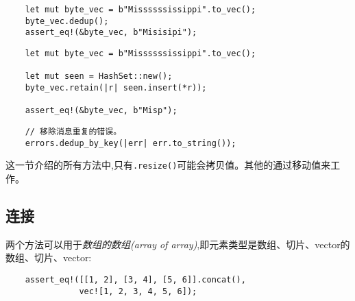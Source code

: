 \begin{verbatim}
    let mut byte_vec = b"Missssssissippi".to_vec();
    byte_vec.dedup();
    assert_eq!(&byte_vec, b"Misisipi");
\end{verbatim}
\begin{verbatim}
    let mut byte_vec = b"Missssssissippi".to_vec();

    let mut seen = HashSet::new();
    byte_vec.retain(|r| seen.insert(*r));

    assert_eq!(&byte_vec, b"Misp");
\end{verbatim}



\begin{verbatim}
    // 移除消息重复的错误。
    errors.dedup_by_key(|err| err.to_string());
\end{verbatim}

这一节介绍的所有方法中,只有\texttt{.resize()}可能会拷贝值。其他的通过移动值来工作。

\subsection{连接}
两个方法可以用于\emph{数组的数组(array of array)},即元素类型是数组、切片、vector的数组、切片、vector:

\begin{verbatim}
    assert_eq!([[1, 2], [3, 4], [5, 6]].concat(),
               vec![1, 2, 3, 4, 5, 6]);
\end{verbatim}

